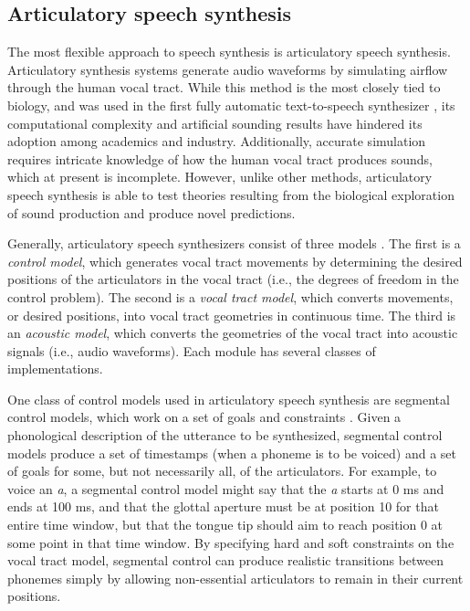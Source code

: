 \documentclass{article}
\begin{document}
\subsection{Articulatory speech synthesis}
\label{subsec:articulatory}

The most flexible approach to speech synthesis
is articulatory speech synthesis.
Articulatory synthesis systems generate
audio waveforms by simulating
airflow through the human vocal tract.
While this method is
the most closely tied to biology,
and was used in the first fully automatic
text-to-speech synthesizer \citep{klatt1987},
its computational complexity
and artificial sounding results
have hindered its adoption
among academics and industry.
Additionally, accurate simulation
requires intricate knowledge
of how the human vocal tract
produces sounds,
which at present is incomplete.
However, unlike other methods,
articulatory speech synthesis
is able to test theories
resulting from the biological exploration
of sound production
and produce novel predictions.

Generally, articulatory speech synthesizers
consist of three models
\citep{kroger2009}.
The first is a \textit{control model},
which generates vocal tract movements
by determining the desired positions
of the articulators in the vocal tract
(i.e., the degrees of freedom in the control problem).
The second is a \textit{vocal tract model},
which converts movements, or desired positions,
into vocal tract geometries in continuous time.
The third is an \textit{acoustic model},
which converts the geometries of the vocal tract
into acoustic signals (i.e., audio waveforms).
Each module has several classes of implementations.

One class of control models used in
articulatory speech synthesis
are segmental control models,
which work on a set of goals and constraints
\citep{kroger1992}.
Given a phonological description
of the utterance to be synthesized,
segmental control models
produce a set of timestamps
(when a phoneme is to be voiced)
and a set of goals for some,
but not necessarily all,
of the articulators.
For example, to voice an \textit{a},
a segmental control model might say
that the \textit{a} starts at 0 ms
and ends at 100 ms,
and that the glottal aperture
must be at position 10
for that entire time window,
but that the tongue tip
should aim to reach position 0
at some point in that time window.
By specifying hard and soft constraints
on the vocal tract model,
segmental control can produce
realistic transitions between
phonemes simply by allowing
non-essential articulators to
remain in their current positions.
\end{document}
